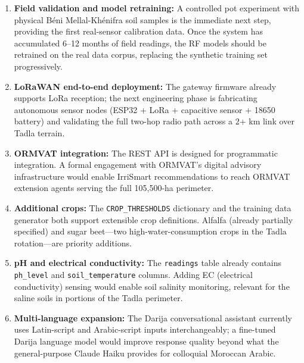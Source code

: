 \documentclass[12pt,a4paper]{report}
\begin{document}
\begin{enumerate}
  \item \textbf{Field validation and model retraining:} A controlled pot experiment with physical Béni Mellal-Khénifra soil samples is the immediate next step, providing the first real-sensor calibration data. Once the system has accumulated 6--12 months of field readings, the RF models should be retrained on the real data corpus, replacing the synthetic training set progressively.

  \item \textbf{LoRaWAN end-to-end deployment:} The gateway firmware already supports LoRa reception; the next engineering phase is fabricating autonomous sensor nodes (ESP32 + LoRa + capacitive sensor + 18650 battery) and validating the full two-hop radio path across a 2+ km link over Tadla terrain.

  \item \textbf{ORMVAT integration:} The REST API is designed for programmatic integration. A formal engagement with ORMVAT's digital advisory infrastructure would enable IrriSmart recommendations to reach ORMVAT extension agents serving the full 105,500-ha perimeter.

  \item \textbf{Additional crops:} The \texttt{CROP\_THRESHOLDS} dictionary and the training data generator both support extensible crop definitions. Alfalfa (already partially specified) and sugar beet---two high-water-consumption crops in the Tadla rotation---are priority additions.

  \item \textbf{pH and electrical conductivity:} The \texttt{readings} table already contains \texttt{ph\_level} and \texttt{soil\_temperature} columns. Adding EC (electrical conductivity) sensing would enable soil salinity monitoring, relevant for the saline soils in portions of the Tadla perimeter.

  \item \textbf{Multi-language expansion:} The Darija conversational assistant currently uses Latin-script and Arabic-script inputs interchangeably; a fine-tuned Darija language model would improve response quality beyond what the general-purpose Claude Haiku provides for colloquial Moroccan Arabic.
\end{enumerate}

\end{document}
